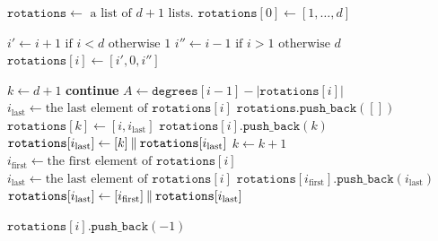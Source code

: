 \documentclass[main.tex]{subfiles}
\begin{document}
\begin{algorithm}[H]
    \caption{\textsc{\generateCartwheelWithLink}($d, \texttt{degrees}$)}
    \label{alg:generate_cartwheel}
    \begin{algorithmic}[1]
        
        \State $\texttt{rotations} \gets \text{ a list of $d+1$ lists}$.
        \State $\texttt{rotations}[0] \gets [1, \ldots, d]$
        
            \State $i' \gets i+1 \text{ if } i < d \text{ otherwise } 1$
            \State $i'' \gets i-1 \text{ if } i > 1 \text{ otherwise } d$
            \State $\texttt{rotations}[i] \gets [i', 0, i'']$
        \EndFor
        
        \State $k \gets d + 1$ 
             
                \State \textbf{continue}
            \EndIf
            \State $A \gets \texttt{degrees}[i-1] - |\texttt{rotations}[i]|$ 
                \State $i_\text{last} \gets \text{the last element of } \texttt{rotations}[i]$
                \State $\texttt{rotations.push\_back}([])$
                \State $\texttt{rotations}[k] \gets [i, i_\text{last}]$
                \State $\texttt{rotations}[i]\texttt{.push\_back}(k)$
                \State $\texttt{rotations}[i_\text{last}] \gets [k] \mathbin{\|} \texttt{rotations}[i_\text{last}]$
                \State $k \gets k + 1$
            \End
            \State $i_\text{first} \gets \text{the first element of } \texttt{rotations}[i]$
            \State $i_\text{last} \gets \text{the last element of } \texttt{rotations}[i]$
            \State $\texttt{rotations}[i_\text{first}]\texttt{.push\_back}(i_\text{last})$
            \State $\texttt{rotations}[i_\text{last}] \gets [i_\text{first}] \mathbin{\|} \texttt{rotations}[i_\text{last}]$
        \EndFor
        
                \State $\texttt{rotations}[i]\texttt{.push\_back}(-1)$ 
            \EndIf
        \EndFor
        

\end{algorithmic}
\end{algorithm}
\end{document}
